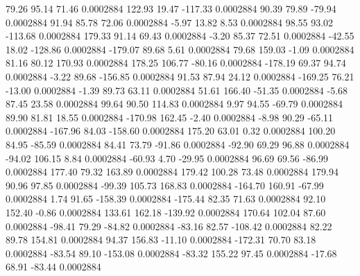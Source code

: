        79.26       95.14       71.46     0.0002884
      122.93       19.47     -117.33     0.0002884
       90.39       79.89      -79.94     0.0002884
       91.94       85.78       72.06     0.0002884
       -5.97       13.82        8.53     0.0002884
       98.55       93.02     -113.68     0.0002884
      179.33       91.14       69.43     0.0002884
       -3.20       85.37       72.51     0.0002884
      -42.55       18.02     -128.86     0.0002884
     -179.07       89.68        5.61     0.0002884
       79.68      159.03       -1.09     0.0002884
       81.16       80.12      170.93     0.0002884
      178.25      106.77      -80.16     0.0002884
     -178.19       69.37       94.74     0.0002884
       -3.22       89.68     -156.85     0.0002884
       91.53       87.94       24.12     0.0002884
     -169.25       76.21      -13.00     0.0002884
       -1.39       89.73       63.11     0.0002884
       51.61      166.40      -51.35     0.0002884
       -5.68       87.45       23.58     0.0002884
       99.64       90.50      114.83     0.0002884
        9.97       94.55      -69.79     0.0002884
       89.90       81.81       18.55     0.0002884
     -170.98      162.45       -2.40     0.0002884
       -8.98       90.29      -65.11     0.0002884
     -167.96       84.03     -158.60     0.0002884
      175.20       63.01        0.32     0.0002884
      100.20       84.95      -85.59     0.0002884
       84.41       73.79      -91.86     0.0002884
      -92.90       69.29       96.88     0.0002884
      -94.02      106.15        8.84     0.0002884
      -60.93        4.70      -29.95     0.0002884
       96.69       69.56      -86.99     0.0002884
      177.40       79.32      163.89     0.0002884
      179.42      100.28       73.48     0.0002884
      179.94       90.96       97.85     0.0002884
      -99.39      105.73      168.83     0.0002884
     -164.70      160.91      -67.99     0.0002884
        1.74       91.65     -158.39     0.0002884
     -175.44       82.35       71.63     0.0002884
       92.10      152.40       -0.86     0.0002884
      133.61      162.18     -139.92     0.0002884
      170.64      102.04       87.60     0.0002884
      -98.41       79.29      -84.82     0.0002884
      -83.16       82.57     -108.42     0.0002884
       82.22       89.78      154.81     0.0002884
       94.37      156.83      -11.10     0.0002884
     -172.31       70.70       83.18     0.0002884
      -83.54       89.10     -153.08     0.0002884
      -83.32      155.22       97.45     0.0002884
      -17.68       68.91      -83.44     0.0002884
